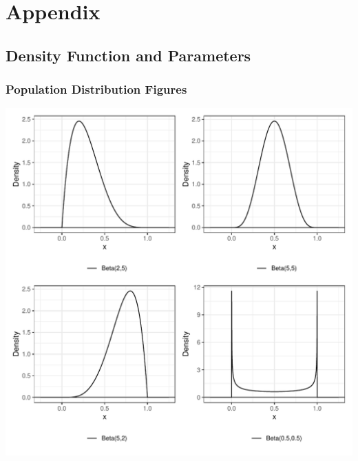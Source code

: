 \documentclass{article}\usepackage[]{graphicx}\usepackage[]{xcolor}
\makeatletter
\def\maxwidth{ %
  \ifdim\Gin@nat@width>\linewidth
    \linewidth
  \else
    \Gin@nat@width
  \fi
}
\newenvironment{knitrout}{}{} %
\makeatother
\begin{document}
\begin{multicols}{2}
\columnbreak

\vspace{2em}

\begin{tiny}

\end{tiny}


\end{multicols}

\newpage
\onecolumn
\section{Appendix}

\subsection{Density Function and Parameters}
\subsubsection{Population Distribution Figures}
\begin{knitrout}\scriptsize
{}\color{fgcolor}
\includegraphics[width=\maxwidth]{figure/plot1-1} 
\end{knitrout}
\end{document}
